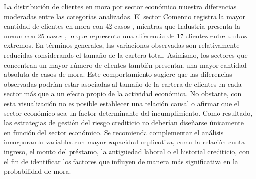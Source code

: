 La distribución de clientes en mora por sector económico muestra diferencias moderadas entre las categorías analizadas. El sector Comercio registra la mayor cantidad de clientes en mora con
42 casos
, mientras que Industria presenta la menor con
25 casos
, lo que representa una diferencia de
17 clientes
entre ambos extremos. En términos generales, las variaciones observadas son relativamente reducidas considerando el tamaño de la cartera total.
Asimismo, los sectores que concentran un mayor número de clientes también presentan una mayor cantidad absoluta de casos de mora. Este comportamiento sugiere que las diferencias observadas podrían estar asociadas al tamaño de la cartera de clientes en cada sector más que a un efecto propio de la actividad económica. No obstante, con esta visualización no es posible establecer una relación causal o afirmar que el sector económico sea un factor determinante del incumplimiento.
Como resultado, las estrategias de gestión del riesgo crediticio no deberían diseñarse únicamente en función del sector económico. Se recomienda complementar el análisis incorporando variables con mayor capacidad explicativa, como la relación cuota-ingreso, el monto del préstamo, la antigüedad laboral o el historial crediticio, con el fin de identificar los factores que influyen de manera más significativa en la probabilidad de mora.